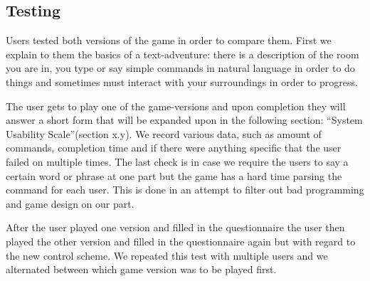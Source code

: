 \subsection{Testing}
Users tested both versions of the game in order to compare them. First we explain to them the basics of a text-adventure: there is a description of the room you are in, you type or say simple commands in natural language in order to do things and sometimes must interact with your surroundings in order to progress. 

The user gets to play one of the game-versions and upon completion they will answer a short form that will be expanded upon in the following section: “System Usability Scale”(section x.y). We record various data, such as amount of commands, completion time and if there were anything specific that the user failed on multiple times. The last check is in case we require the users to say a certain word or phrase at one part but the game has a hard time parsing the command for each user. This is done in an attempt to filter out bad programming and game design on our part.

After the user played one version and filled in the questionnaire the user then played the other version and filled in the questionnaire again but with regard to the new control scheme. We repeated this test with multiple users and we alternated between which game version was to be played first.